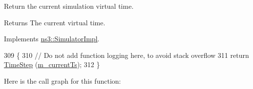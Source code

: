 Return the current simulation virtual time.

\begin{DoxyReturn}{Returns}
The current virtual time. 
\end{DoxyReturn}


Implements \hyperlink{classns3_1_1SimulatorImpl_aa516c50060846adc6fd316e83ef0797c}{ns3\+::\+Simulator\+Impl}.


\begin{DoxyCode}
309 \{
310   \textcolor{comment}{// Do not add function logging here, to avoid stack overflow}
311   \textcolor{keywordflow}{return} \hyperlink{group__time_ga464a3c1cbb458c6c3ed3bd5ce9506758}{TimeStep} (\hyperlink{classns3_1_1DefaultSimulatorImpl_a8895b26ba85208a9f933ffa4ffcd92c2}{m\_currentTs});
312 \}
\end{DoxyCode}


Here is the call graph for this function\+:



